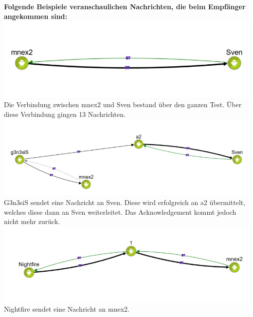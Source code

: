 \textbf{Folgende Beispiele veranschaulichen Nachrichten, die beim
Empfänger angekommen sind:}
\includegraphics[width=1.0\textwidth]{belege/grosstests/Bilder/Grosstest2/Test2Erfolg1.jpg}
Die Verbindung zwischen mnex2 und Sven bestand über den ganzen Test.
Über diese Verbindung gingen 13 Nachrichten.
\includegraphics[width=1.0\textwidth]{belege/grosstests/Bilder/Grosstest2/Test2Erfolg3.jpg}
G3n3siS sendet eine Nachricht an Sven. Diese wird erfolgreich an a2
übermittelt, welches diese dann an Sven weiterleitet. Das
Acknowledgement kommt jedoch nicht mehr zurück.
\includegraphics[width=1.0\textwidth]{belege/grosstests/Bilder/Grosstest2/Test2Erfolg4.jpg}
Nightfire sendet eine Nachricht an mnex2.

